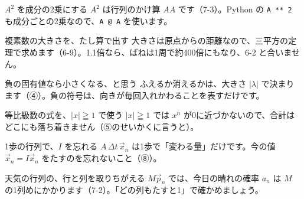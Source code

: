 
\begin{tsumazuki}{$A^2$ を成分の2乗にする}
$A^2$ は行列のかけ算 $AA$ です（7-3）。Python の \texttt{A ** 2} も成分ごとの2乗なので、\texttt{A @ A} を使います。
\end{tsumazuki}

\begin{tsumazuki}{複素数の大きさを、たし算で出す}
大きさは原点からの距離なので、三平方の定理で求めます（6-9）。1.1倍なら、ばねは1周で約400倍にもなり、6-2 と合いません。
\end{tsumazuki}

\begin{tsumazuki}{負の固有値なら小さくなる、と思う}
ふえるか消えるかは、大きさ $|\lambda|$ で決まります（④）。負の符号は、向きが毎回入れかわることを表すだけです。
\end{tsumazuki}

\begin{tsumazuki}{等比級数の式を、$|x|\geqq1$ で使う}
$|x|\geqq1$ では $x^n$ が0に近づかないので、合計はどこにも落ち着きません（⑤のせいかくに言うと）。
\end{tsumazuki}

\begin{tsumazuki}{1歩の行列で、$I$ を忘れる}
$A\,\Delta t\,\vec x_n$ は1歩で「変わる量」だけです。今の値 $\vec x_n=I\vec x_n$ をたすのを忘れないこと（⑧）。
\end{tsumazuki}

\begin{tsumazuki}{天気の行列の、行と列を取りちがえる}
$M\vec p_n$ では、今日の晴れの確率 $a_n$ は $M$ の1列めにかかります（7-2）。「どの列もたすと1」で確かめましょう。
\end{tsumazuki}

